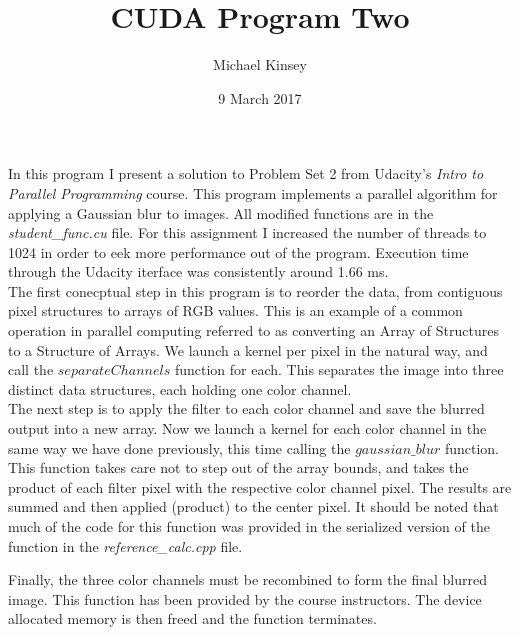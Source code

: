 \documentclass{article}
\begin{document}
\title{CUDA Program Two}
\author{Michael Kinsey}
\date{9 March 2017}
\maketitle

In this program I present a solution to Problem Set 2 from Udacity's \textit{Intro
to Parallel Programming} course. This program implements a parallel algorithm for
applying a Gaussian blur to images. All modified functions are in the 
\textit{student\_func.cu} file. For this assignment I increased the number of 
threads to 1024 in order to eek more performance out of the program. Execution
time through the Udacity iterface was consistently around 1.66 ms.\\

The first conecptual step in this program is to reorder the data, from contiguous
pixel structures to arrays of RGB values. This is an example of a common 
operation in parallel computing referred to as converting an Array of Structures
to a Structure of Arrays.
We launch a kernel per pixel in the natural way, and call the $separateChannels$
function for each. This separates the image into three distinct data structures,
each holding one color channel.\\

The next step is to apply the filter to each color channel and save the blurred
output into a new array. Now we launch a kernel for each color channel in the 
same way we have done previously, this time calling the $gaussian\_blur$ 
function. This function takes care not to step out of the array bounds, and 
takes the product of each filter pixel with the respective color channel pixel.
The results are summed and then applied (product) to the center pixel. It should
be noted that much of the code for this function was provided in the serialized
version of the function in the \textit{reference\_calc.cpp} file.

Finally, the three color channels must be recombined to form the final blurred 
image. This function has been provided by the course instructors. The device 
allocated memory is then freed and the function terminates.
\end{document}
